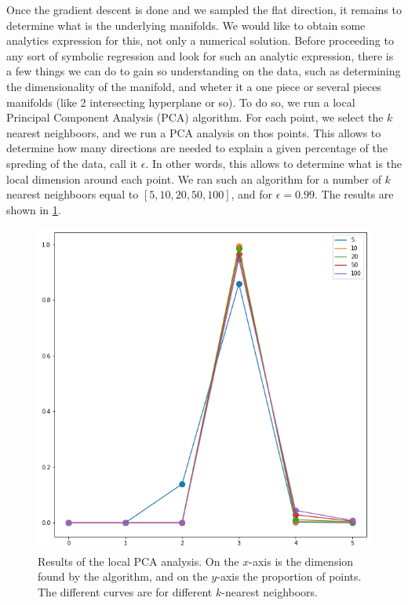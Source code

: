 \documentclass[11pt]{article}
\begin{document}
\begin{itemize}[label=\textbullet]
		Once the gradient descent is done and we sampled the flat direction, it remains to determine what is the underlying manifolds. We would like to obtain some analytics expression for this, not only a numerical solution. Before proceeding to any sort of symbolic regression and look for such an analytic expression, there is a few things we can do to gain so understanding on the data, such as determining the dimensionality of the manifold, and wheter it a one piece or several pieces manifolds (like 2 intersecting hyperplane or so). To do so, we run a local Principal Component Analysis (PCA) algorithm. For each point, we select the $k$ nearest neighboors, and we run a PCA analysis on thos points. This allows to determine how many directions are needed to explain a given percentage of the spreding of the data, call it $\epsilon$. In other words, this allows to determine what is the local dimension around each point. We ran such an algorithm for a number of $k$ nearest neighboors equal to $[5,10,20,50,100]$, and for $\epsilon = 0.99$. The results are shown in \ref{local_pca}.
		\begin{figure}
			\centering
			\includegraphics[scale=0.5]{Figures/Local_PCA.png}
			\caption{Results of the local PCA analysis. On the $x$-axis is the dimension found by the algorithm, and on the $y$-axis the proportion of points. The different curves are for different $k$-nearest neighboors.}
			\label{local_pca}
		\end{figure} 
		

\end{itemize}
\end{document}
